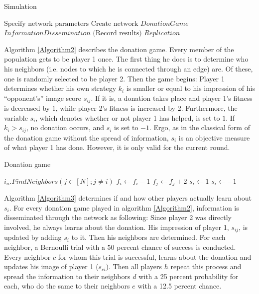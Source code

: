 \documentclass{JASSS}
\begin{document}
\begin{algorithm}
	\caption{Simulation}
	\label{Algorithm1}
	\begin{algorithmic}[1]
		\State $\text{Specify network parameters}$
		\State $\text{Create network}$
		\State $DonationGame$
		\State $InformationDissemination$
		\EndFor
		\State $\text{(Record results)}$
		\State $Replication$
		\EndFor
		\EndFunction
	\end{algorithmic}
\end{algorithm}

Algorithm \ref{Algorithm2} describes the donation game. Every member of the population gets to be player 1 once. The first thing he does is to determine who his neighbors (i.e. nodes to which he is connected through an edge) are. Of these, one is randomly selected to be player 2. Then the game begins: Player 1 determines whether his own strategy $k_i$ is smaller or equal to his impression of his ``opponent's'' image score $s_{ij}$. If it is, a donation takes place and player 1's fitness is decreased by $1$, while player 2's fitness is increased by $2$. Furthermore, the variable $s_i$, which denotes whether or not player 1 has helped, is set to $1$. If $k_i>s_{ij}$, no donation occurs, and $s_i$ is set to $-1$. Ergo, as in the classical form of the donation game without the spread of information, $s_i$ is an objective measure of what player 1 has done. However, it is only valid for the current round.

\begin{algorithm}
	\caption{Donation game}
	\label{Algorithm2}
	\begin{algorithmic}[1]
		\State $i_{n}.FindNeighbors(j\in[N];j\neq i)$
		\State $f_i \gets f_i-1$
		\State $f_j \gets f_j+2$
		\State $s_{i} \gets 1$
		\Else
		\State $s_{i} \gets -1$
		\EndIf
		\EndFor
		\EndFunction
	\end{algorithmic}
\end{algorithm}

Algorithm \ref{Algorithm3} determines if and how other players actually learn about $s_i$. For every donation game played in algorithm \ref{Algorithm2}, information is disseminated through the network as following: Since player 2 was directly involved, he always learns about the donation. His impression of player 1, $s_{ij}$, is updated by adding $s_i$ to it. Then his neighbors are determined. For each neighbor, a Bernoulli trial with a 50 percent chance of success is conducted. Every neighbor $c$ for whom this trial is successful, learns about the donation and updates his image of player 1 ($s_{ci}$). Then all players $h$ repeat this process and spread the information to their neighbors $d$ with a 25 percent probability for each, who do the same to their neighbors $e$ with a 12.5 percent chance.
\end{document}
